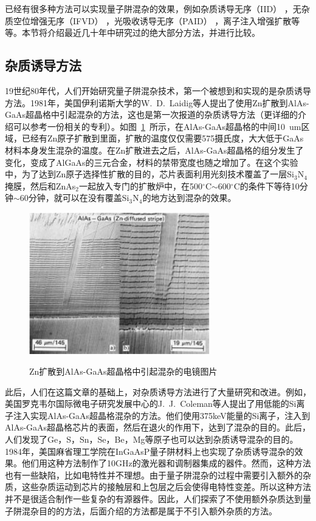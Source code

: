 \documentclass{ZJUthesis}
\begin{document}
已经有很多种方法可以实现量子阱混杂的效果，例如杂质诱导无序（IID） \cite{holonyak1998impurity} ，无杂质空位增强无序（IFVD） \cite{si1998area}，光吸收诱导无序（PAID） \cite{mckee1997monolithic}，离子注入增强扩散\cite{charbonneau1998photonic}等等。本节将介绍最近几十年中研究过的绝大部分方法，并进行比较。

\subsection{杂质诱导方法}

19世纪80年代，人们开始研究量子阱混杂技术，第一个被想到和实现的是杂质诱导方法。1981年，美国伊利诺斯大学的W.~D.~Laidig等人提出了使用Zn扩散到AlAs-GaAs超晶格中引起混杂的方法\cite{laidig1981disorder}，这也是第一次报道的杂质诱导方法（更详细的介绍可以参考一份相关的专利\cite{holonyak1983method}）。如图~\ref{fig_iid}~所示，在AlAs-GaAs超晶格的中间10~um区域，已经有Zn原子扩散到里面，扩散的温度仅仅需要575摄氏度，大大低于GaAs材料本身发生混杂的温度。在Zn扩散进去之后，AlAs-GaAs超晶格的组分发生了变化，变成了AlGaAs的三元合金，材料的禁带宽度也随之增加了。在这个实验中，为了达到Zn原子选择性扩散的目的，芯片表面利用光刻技术覆盖了一层Si$_3$N$_4$掩膜，然后和ZnAs$_2$一起放入专门的扩散炉中，在500$^{\circ}$C$\sim$600$^{\circ}$C的条件下等待10分钟$\sim$60分钟，就可以在没有覆盖Si$_3$N$_4$的地方达到混杂的效果。

\begin{figure}[htbp]
  \centering
  \includegraphics[width=0.7\textwidth]{./Pictures/iid.eps}\\
  \caption{Zn扩散到AlAs-GaAs超晶格中引起混杂的电镜图片}
  \label{fig_iid}
\end{figure}

此后，人们在这篇文章的基础上，对杂质诱导方法进行了大量研究和改进。例如，美国罗克韦尔国际微电子研究发展中心的J.~J.~Coleman等人提出了用低能的Si离子注入实现AlAs-GaAs超晶格混杂的方法\cite{Coleman1982Disorder}。他们使用375keV能量的Si离子，注入到AlAs-GaAs超晶格芯片的表面，然后在退火的作用下，达到了混杂的目的。此后，人们发现了Ge，S，Sn，Se，Be，Mg等原子也可以达到杂质诱导混杂的目的。1984年，美国麻省理工学院在InGaAsP量子阱材料上也实现了杂质诱导混杂的效果。他们用这种方法制作了10GHz的激光器和调制器集成的器件\cite{Tsang1981Intracavity}。然而，这种方法也有一些缺陷，比如电特性并不理想。由于量子阱混杂的过程中需要引入额外的杂质，这些杂质运动到芯片的接触层和上包层之后会使得电特性变差。所以这种方法并不是很适合制作一些复杂的有源器件。因此，人们探索了不使用额外杂质达到量子阱混杂目的的方法，后面介绍的方法都是属于不引入额外杂质的方法。
\end{document}
